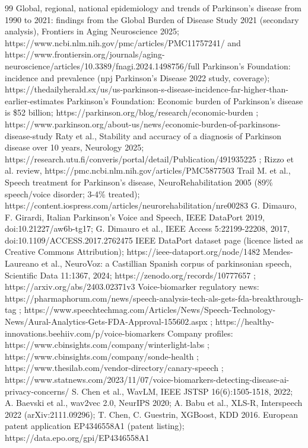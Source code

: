 \documentclass[10pt,a4paper]{article}
\begin{document}
\begin{thebibliography}{99}\setlength{\itemsep}{1pt}\scriptsize
{} Global, regional, national epidemiology and trends of Parkinson's disease from 1990 to 2021: findings from the Global Burden of Disease Study 2021 (secondary analysis), Frontiers in Aging Neuroscience 2025; https://www.ncbi.nlm.nih.gov/pmc/articles/PMC11757241/ and https://www.frontiersin.org/journals/aging-neuroscience/articles/10.3389/fnagi.2024.1498756/full
 Parkinson's Foundation: incidence and prevalence (npj Parkinson's Disease 2022 study, coverage); https://thedailyherald.sx/us/us-parkinson-s-disease-incidence-far-higher-than-earlier-estimates
 Parkinson's Foundation: Economic burden of Parkinson's disease is \$52 billion; https://parkinson.org/blog/research/economic-burden ; https://www.parkinson.org/about-us/news/economic-burden-of-parkinsons-disease-study
 Raty et al., Stability and accuracy of a diagnosis of Parkinson disease over 10 years, Neurology 2025; https://research.utu.fi/converis/portal/detail/Publication/491935225 ; Rizzo et al. review, https://pmc.ncbi.nlm.nih.gov/articles/PMC5877503
 Trail M. et al., Speech treatment for Parkinson's disease, NeuroRehabilitation 2005 (89\% speech/voice disorder; 3-4\% treated); https://content.iospress.com/articles/neurorehabilitation/nre00283
 G. Dimauro, F. Girardi, Italian Parkinson's Voice and Speech, IEEE DataPort 2019, doi:10.21227/aw6b-tg17; G. Dimauro et al., IEEE Access 5:22199-22208, 2017, doi:10.1109/ACCESS.2017.2762475
 IEEE DataPort dataset page (licence listed as Creative Commons Attribution); https://ieee-dataport.org/node/1482
 Mendes-Laureano et al., NeuroVoz: a Castillian Spanish corpus of parkinsonian speech, Scientific Data 11:1367, 2024; https://zenodo.org/records/10777657 ; https://arxiv.org/abs/2403.02371v3
 Voice-biomarker regulatory news: https://pharmaphorum.com/news/speech-analysis-tech-als-gets-fda-breakthrough-tag ; https://www.speechtechmag.com/Articles/News/Speech-Technology-News/Aural-Analytics-Gets-FDA-Approval-155602.aspx ; https://healthy-innovations.beehiiv.com/p/voice-biomarkers
 Company profiles: https://www.cbinsights.com/company/winterlight-labs ; https://www.cbinsights.com/company/sonde-health ; https://www.thesilab.com/vendor-directory/canary-speech ; https://www.statnews.com/2023/11/07/voice-biomarkers-detecting-disease-ai-privacy-concerns/
 S. Chen et al., WavLM, IEEE JSTSP 16(6):1505-1518, 2022; A. Baevski et al., wav2vec 2.0, NeurIPS 2020; A. Babu et al., XLS-R, Interspeech 2022 (arXiv:2111.09296); T. Chen, C. Guestrin, XGBoost, KDD 2016.
 European patent application EP4346558A1 (patent listing); https://data.epo.org/gpi/EP4346558A1
\end{thebibliography}
\end{document}

